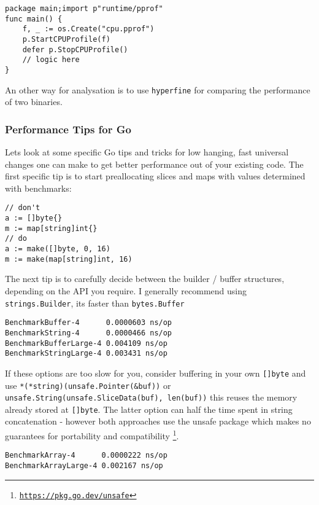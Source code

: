     \begin{verbatim}
package main;import p"runtime/pprof"
func main() {
    f, _ := os.Create("cpu.pprof")
    p.StartCPUProfile(f)
    defer p.StopCPUProfile()
    // logic here
}
    \end{verbatim}

    An other way for analysation is to use \texttt{hyperfine} for comparing the
    performance of two binaries.

    \subsubsection*{Performance Tips for Go}

    Lets look at some specific Go tips and tricks for low hanging, fast
    universal changes one can make to get better performance out of your
    existing code. The first specific tip is to start preallocating slices and
    maps with values determined with benchmarks:

    \begin{verbatim}
// don't
a := []byte{}
m := map[string]int{}
// do
a := make([]byte, 0, 16)
m := make(map[string]int, 16)
    \end{verbatim}

    The next tip is to carefully decide between the builder / buffer
    structures, depending on the API you require. I generally recommend using
    \texttt{strings.Builder}, its faster than
    \texttt{bytes.Buffer} 

    \begin{verbatim}
BenchmarkBuffer-4      0.0000603 ns/op
BenchmarkString-4      0.0000466 ns/op
BenchmarkBufferLarge-4 0.004109 ns/op
BenchmarkStringLarge-4 0.003431 ns/op
    \end{verbatim}

    If these options are too slow for you, consider buffering in your own
    \texttt{[]byte} and use
    \texttt{*(*string)(unsafe.Pointer(&buf))} or
    \texttt{unsafe.String(unsafe.SliceData(buf), len(buf))} this reuses
    the memory already stored at \texttt{[]byte}. The latter option can
    half the time spent in string concatenation - however both approaches use
    the unsafe package which makes no guarantees for portability and
    compatibility
    \footnote{\href{https://pkg.go.dev/unsafe}{\texttt{https://pkg.go.dev/unsafe}}}.

    \begin{verbatim}
BenchmarkArray-4      0.0000222 ns/op
BenchmarkArrayLarge-4 0.002167 ns/op
    \end{verbatim}

